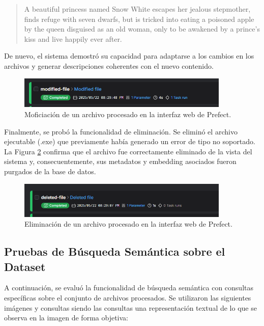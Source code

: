 \begin{quote}
A beautiful princess named Snow White escapes her jealous stepmother, finds refuge with seven dwarfs, but is tricked into eating a poisoned apple by the queen disguised as an old woman, only to be awakened by a prince's kiss and live happily ever after.
\end{quote}

De nuevo, el sistema demostró su capacidad para adaptarse a los cambios en los archivos y generar descripciones coherentes con el nuevo contenido.

\begin{figure}[H]
\centering
\includegraphics[width=0.9\textwidth]{archivos/result_web_modified.png}
\caption[Modificación de un archivo procesado]{Moficiación de un archivo procesado en la interfaz web de Prefect.}
\label{fig:result_web_modified_file}
\end{figure}

Finalmente, se probó la funcionalidad de eliminación. Se eliminó el archivo ejecutable (.exe) que previamente había generado un error de tipo no soportado. La Figura \ref{fig:result_web_delete_file} confirma que el archivo fue correctamente eliminado de la vista del sistema y, consecuentemente, sus metadatos y embedding asociados fueron purgados de la base de datos.

\begin{figure}[H]
\centering
\includegraphics[width=0.9\textwidth]{archivos/result_web_delete.png}
\caption[Eliminación de un archivo procesado]{Eliminación de un archivo procesado en la interfaz web de Prefect.}
\label{fig:result_web_delete_file}
\end{figure}

\subsection{Pruebas de Búsqueda Semántica sobre el Dataset}

A continuación, se evaluó la funcionalidad de búsqueda semántica con consultas específicas sobre el conjunto de archivos procesados. Se utilizaron las siguientes imágenes y consultas siendo las consultas una representación textual de lo que se observa en la imagen de forma objetiva:

